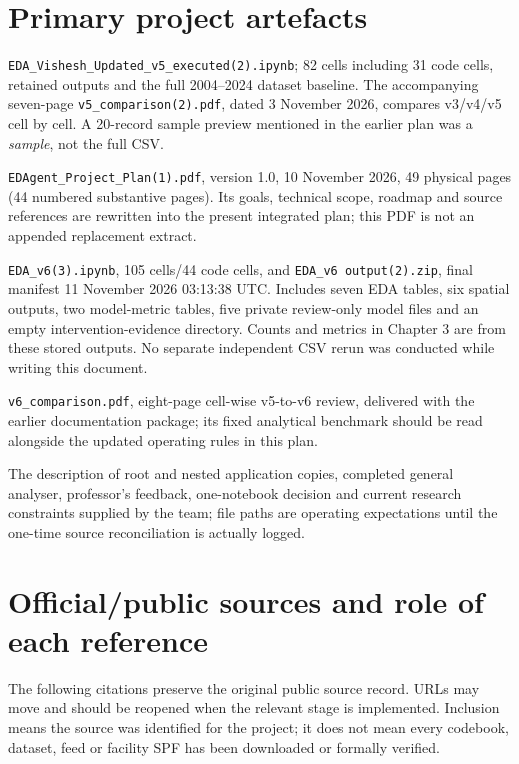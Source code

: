 \documentclass[11pt,a4paper,openany]{report}
\newcommand{\pathcode}[1]{\nolinkurl{#1}}
\begin{document}
\section{Primary project artefacts}
\begin{description}[style=nextline,leftmargin=0pt,itemsep=5pt]
\item[B1 -- Earlier analytical baseline.] \pathcode{EDA_Vishesh_Updated_v5_executed(2).ipynb}; 82 cells including 31 code cells, retained outputs and the full 2004--2024 dataset baseline. The accompanying seven-page \pathcode{v5_comparison(2).pdf}, dated 3 November 2026, compares v3/v4/v5 cell by cell. A 20-record sample preview mentioned in the earlier plan was a \emph{sample}, not the full CSV.
\item[B2 -- Original planning record.] \pathcode{EDAgent_Project_Plan(1).pdf}, version 1.0, 10 November 2026, 49 physical pages (44 numbered substantive pages). Its goals, technical scope, roadmap and source references are rewritten into the present integrated plan; this PDF is not an appended replacement extract.
\item[B3 -- Current executed evidence.] \pathcode{EDA_v6(3).ipynb}, 105 cells/44 code cells, and \pathcode{EDA_v6 output(2).zip}, final manifest 11 November 2026 03:13:38 UTC. Includes seven EDA tables, six spatial outputs, two model-metric tables, five private review-only model files and an empty intervention-evidence directory. Counts and metrics in Chapter 3 are from these stored outputs. No separate independent CSV rerun was conducted while writing this document.
\item[B4 -- Companion report.] \pathcode{v6_comparison.pdf}, eight-page cell-wise v5-to-v6 review, delivered with the earlier documentation package; its fixed analytical benchmark should be read alongside the updated operating rules in this plan.
\item[B5 -- Team/repository context.] The description of root and nested application copies, completed general analyser, professor's feedback, one-notebook decision and current research constraints supplied by the team; file paths are operating expectations until the one-time source reconciliation is actually logged.
\end{description}

\section{Official/public sources and role of each reference}
The following citations preserve the original public source record. URLs may move and should be reopened when the relevant stage is implemented. Inclusion means the source was identified for the project; it does not mean every codebook, dataset, feed or facility SPF has been downloaded or formally verified.
\end{document}
